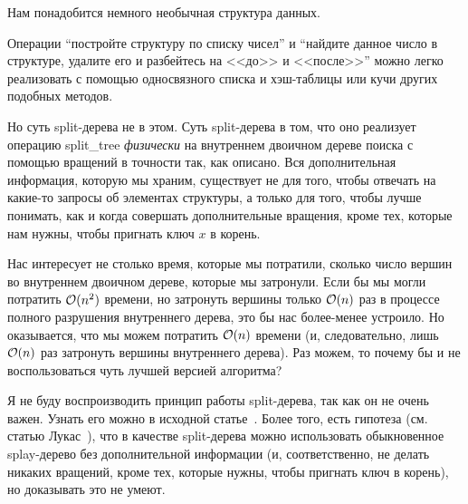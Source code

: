 Нам понадобится немного необычная структура данных.


\begin{remark} Операции ``постройте структуру по списку чисел'' и ``найдите данное число в структуре, удалите его и разбейтесь на <<до>> и <<после>>'' можно легко реализовать с помощью односвязного списка и хэш-таблицы или кучи других подобных методов.

	Но суть split-дерева не в этом. Суть split-дерева в том, что оно реализует операцию \textrm{split\_tree} \emph{физически} на внутреннем двоичном дереве поиска с помощью вращений в точности так, как описано. Вся дополнительная информация, которую мы храним, существует не для того, чтобы отвечать на какие-то запросы об элементах структуры, а только для того, чтобы лучше понимать, как и когда совершать дополнительные вращения, кроме тех, которые нам нужны, чтобы пригнать ключ $x$ в корень.

	Нас интересует не столько время, которые мы потратили, сколько число вершин во внутреннем двоичном дереве, которые мы затронули. Если бы мы могли потратить $\mathcal{O}(n^2)$ времени, но затронуть вершины только $\mathcal{O}(n)$ раз в процессе полного разрушения внутреннего дерева, это бы нас более-менее устроило. Но оказывается, что мы можем потратить $\mathcal{O}(n)$ времени (и, следовательно, лишь $\mathcal{O}(n)$ раз затронуть вершины внутреннего дерева). Раз можем, то почему бы и не воспользоваться чуть лучшей версией алгоритма?

	Я не буду воспроизводить принцип работы split-дерева, так как он не очень важен. Узнать его можно в исходной статье~\cite{demaine2009geometry}. Более того, есть гипотеза (см. статью Лукас~\cite{lucas1988canonical}), что в качестве split-дерева можно использовать обыкновенное splay-дерево без дополнительной информации (и, соответственно, не делать никаких вращений, кроме тех, которые нужны, чтобы пригнать ключ в корень), но доказывать это не умеют.
\end{remark}

